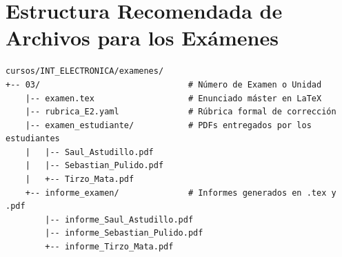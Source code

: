 \documentclass[12pt,letterpaper]{article}
\begin{document}
\section{Estructura Recomendada de Archivos para los Exámenes}

\begin{verbatim}
cursos/INT_ELECTRONICA/examenes/
+-- 03/                              # Número de Examen o Unidad
    |-- examen.tex                   # Enunciado máster en LaTeX
    |-- rubrica_E2.yaml              # Rúbrica formal de corrección
    |-- examen_estudiante/           # PDFs entregados por los estudiantes
    |   |-- Saul_Astudillo.pdf
    |   |-- Sebastian_Pulido.pdf
    |   +-- Tirzo_Mata.pdf
    +-- informe_examen/              # Informes generados en .tex y .pdf
        |-- informe_Saul_Astudillo.pdf
        |-- informe_Sebastian_Pulido.pdf
        +-- informe_Tirzo_Mata.pdf
\end{verbatim}
\end{document}
